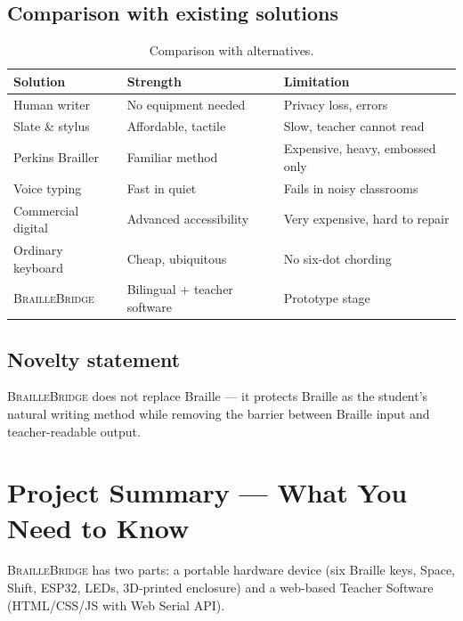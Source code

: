 \documentclass[11pt,a4paper,twoside]{article}
\newcommand{\projectname}{\textsc{BrailleBridge}}
\begin{document}
\subsection*{Comparison with existing solutions}
\begin{table}[H]\centering
\caption{Comparison with alternatives.}\label{tab:comparison}
\begin{tabular}{p{2.8cm} p{3.8cm} p{4.8cm}}\toprule
\bfseries Solution & \bfseries Strength & \bfseries Limitation \\\midrule
Human writer & No equipment needed & Privacy loss, errors \\
Slate \& stylus & Affordable, tactile & Slow, teacher cannot read \\
Perkins Brailler & Familiar method & Expensive, heavy, embossed only \\
Voice typing & Fast in quiet & Fails in noisy classrooms \\
Commercial digital & Advanced accessibility & Very expensive, hard to repair \\
Ordinary keyboard & Cheap, ubiquitous & No six-dot chording \\
\rowcolor{lineshade}\projectname{} & Bilingual + teacher software & Prototype stage \\\bottomrule
\end{tabular}\end{table}

\subsection*{Novelty statement}
\projectname{} does not replace Braille --- it protects Braille as the
student's natural writing method while removing the barrier between
Braille input and teacher-readable output.

\section{Project Summary --- What You Need to Know}

\projectname{} has two parts: a portable hardware device (six Braille keys,
Space, Shift, ESP32, LEDs, 3D-printed enclosure) and a web-based Teacher
Software (HTML/CSS/JS with Web Serial API).
\end{document}
